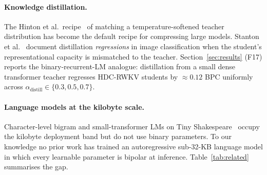\documentclass[runningheads]{llncs}
\begin{document}
\paragraph{Knowledge distillation.}
The Hinton et al.\ recipe~\cite{hinton2015distilling} of matching a
temperature-softened teacher distribution has become the default recipe
for compressing large models. Stanton et al.~\cite{stanton2021does}
document distillation \emph{regressions} in image classification when
the student's representational capacity is mismatched to the teacher.
Section~\ref{sec:results} (F17) reports the binary-recurrent-LM
analogue: distillation from a small dense transformer teacher
regresses HDC-RWKV students by ${\approx}0.12$ BPC uniformly across
$\alpha_{\mathrm{distill}} \in \{0.3, 0.5, 0.7\}$.

\paragraph{Language models at the kilobyte scale.}
Character-level bigram and small-transformer LMs on
Tiny Shakespeare~\cite{karpathy2015tinyshakespeare} occupy the
kilobyte deployment band but do not use binary parameters. To our
knowledge no prior work has trained an autoregressive sub-32-KB
language model in which every learnable parameter is bipolar at
inference. Table~\ref{tab:related} summarises the gap.
\end{document}
